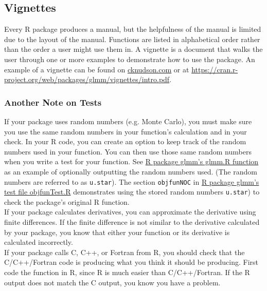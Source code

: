 \documentclass{article}
\begin{document}
\subsection{Vignettes}
Every R package produces a manual, but the helpfulness of the manual is limited due to the layout of the manual. Functions are listed in alphabetical order rather than the order a user might use them in. A vignette is a document that walks the user through one or more examples to demonstrate how to use the package. An example of a vignette can be found on \href{cknudson.com}{\url{cknudson.com}} or at  \href{https://cran.r-project.org/web/packages/glmm/vignettes/intro.pdf}{\url{https://cran.r-project.org/web/packages/glmm/vignettes/intro.pdf}}.

\subsubsection{Another Note on Tests}
If your package uses random numbers (e.g. Monte Carlo), you must make sure you use the same random numbers in your function's calculation and in your check. In your R code, you can create an option to  keep track of the random numbers used in your function. You can then use those same random numbers when you write a test for your function. See \href{https://github.com/knudson1/glmm/blob/master2/glmm/R/glmm.R}{R package glmm's glmm.R function} as an example of optionally outputting the random numbers used. (The random numbers are referred to as \texttt{u.star}). The section \texttt{objfunNOC} in \href{https://github.com/knudson1/glmm/blob/master2/glmm/tests/objfunTest.R}{R package glmm's test file objfunTest.R} demonstrates  using the stored random numbers \texttt{u.star}) to check the package's original R function.\\

If your package calculates derivatives, you can approximate the derivative using finite differences. If the finite difference is not similar to the derivative calculated by your package, you know that either your function or its derivative is calculated incorrectly.  \\

If your package calls C, C++, or Fortran from R, you should check that the C/C++/Fortran code is producing what you think it should be producing. First code the function in R, since R is much easier than C/C++/Fortran. If the R output does not match the C output, you know you have a problem.
\end{document}
